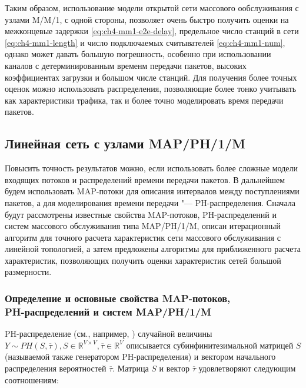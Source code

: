 Таким образом, использование модели открытой сети массового ообслуживания с узлами M/M/1, с одной стороны, позволяет очень быстро получить оценки на межконцевые задержки \eqref{eq:ch4-mm1-e2e-delay}, предельное число станций в сети \eqref{eq:ch4-mm1-length} и число подключаемых считывателей \eqref{eq:ch4-mm1-num}, однако может давать большую погрешность, особенно при использовании каналов с детерминированным временм передачи пакетов, высоких коэффициентах загрузки и большом числе станций. Для получения более точных оценок можно использовать распределения, позволяющие более тонко учитывать как характеристики трафика, так и более точно моделировать время передачи пакетов.







\subsection{Линейная сеть с узлами MAP/PH/1/M}
Повысить точность результатов можно, если использовать более сложные модели входящих потоков и распределений времени передачи пакетов. В дальнейшем будем использовать MAP-потоки для описания интервалов между поступлениями пакетов, а для моделирования времени передачи "--- PH-распределения. Сначала будут рассмотрены известные свойства MAP-потоков, PH-распределений и систем массового обслуживания типа MAP/PH/1/M, описан итерационный алгоритм для точного расчета характеристик сети массового обслуживания с линейной топологией, а затем предложены алгоритмы для приближенного расчета характеристик, позволяющих получить оценки характеристик сетей большой размерности.


\subsubsection{Определение и основные свойства MAP-потоков, \\PH-распределений и систем MAP/PH/1/M}


PH-распределение (см., например, \cite{Buchholz2014,VishnevskyDudin2018}) случайной величины $Y \sim  PH(S, \overline{\tau}), S \in \mathbb{R}^{V \times V}, \overline{\tau} \in \mathbb{R}^V$ описывается субинфинитезимальной матрицей $S$ (называемой также генератором PH-распределения) и вектором начального распределения вероятностей $\overline{\tau}$. Матрица $S$ и вектор $\overline{\tau}$ удовлетворяют следующим соотношениям:

